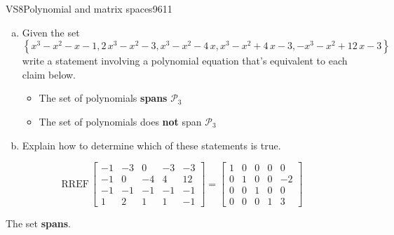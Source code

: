 \begin{exercise}{VS8}{Polynomial and matrix spaces}{9611} 
\begin{exerciseStatement} 

\begin{enumerate}[(a)]
\item  

 Given the set \[\left\{ x^{3} - x^{2} - x - 1 , 2 \, x^{3} - x^{2} - 3 , x^{3} - x^{2} - 4 \, x , x^{3} - x^{2} + 4 \, x - 3 , -x^{3} - x^{2} + 12 \, x - 3 \right\}\] write a statement involving a polynomial equation that's equivalent to each claim below. 

 

\begin{itemize}
\item  

 The set of polynomials \textbf{spans} \(\mathcal{P}_3\) 

 
\item  

 The set of polynomials does \textbf{not} span \(\mathcal{P}_3\) 

 
\end{itemize}

     
\item  

 Explain how to determine which of these statements is true. 

 
\end{enumerate}

     \end{exerciseStatement}
 \begin{exerciseAnswer} 

 \[
\mathrm{RREF}\, \left[\begin{array}{ccccc}
-1 & -3 & 0 & -3 & -3 \\
-1 & 0 & -4 & 4 & 12 \\
-1 & -1 & -1 & -1 & -1 \\
1 & 2 & 1 & 1 & -1
\end{array}\right] = \left[\begin{array}{ccccc}
1 & 0 & 0 & 0 & 0 \\
0 & 1 & 0 & 0 & -2 \\
0 & 0 & 1 & 0 & 0 \\
0 & 0 & 0 & 1 & 3
\end{array}\right]
            \] 

 

 The set \textbf{spans}. 

 \end{exerciseAnswer}
 \end{exercise}


